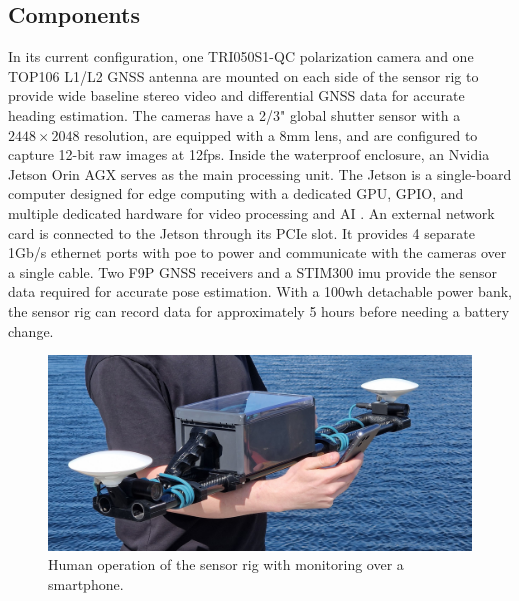 \subsection{Components}
In its current configuration, one TRI050S1-QC polarization camera and one TOP106 L1/L2 GNSS antenna are mounted on each side of the sensor rig to provide wide baseline stereo video and differential GNSS data for accurate heading estimation.
The cameras have a 2/3" global shutter sensor with a $2448\times2048$ resolution, are equipped with a 8mm lens, and are configured to capture 12-bit raw images at 12fps.
Inside the waterproof enclosure, an Nvidia Jetson Orin AGX serves as the main processing unit.
The Jetson is a single-board computer designed for edge computing with a dedicated GPU, GPIO, and multiple dedicated hardware for video processing and AI \cite{karumbunathanNVIDIAJetsonAGX2022}.
An external network card is connected to the Jetson through its PCIe slot. 
It provides 4 separate 1Gb/s ethernet ports with \gls{poe} to power and communicate with the cameras over a single cable.
Two F9P GNSS receivers and a STIM300 \gls{imu} provide the sensor data required for accurate pose estimation.
With a 100wh detachable power bank, the sensor rig can record data for approximately 5 hours before needing a battery change.

\begin{figure}[H]
    \centering
    \includegraphics[trim={0 1cm 0 1cm},clip,width=\textwidth]{figures/operation.jpg}
    \caption{Human operation of the sensor rig with monitoring over a smartphone. \label{fig:operation}}
\end{figure}


